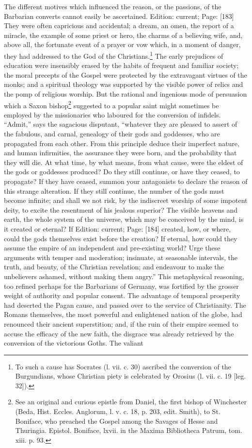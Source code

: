 The different motives which influenced the reason, or the passions, of the Barbarian converts cannot easily be ascertained. Edition: current; Page: [183] They were often capricious and accidental; a dream, an omen, the report of a miracle, the example of some priest or hero, the charms of a believing wife, and, above all, the fortunate event of a prayer or vow which, in a moment of danger, they had addressed to the God of the Christians.\footnote{To such a cause has Socrates (l. vii. c. 30) ascribed the conversion of the Burgundians, whose Christian piety is celebrated by Orosius (l. vii. c. 19 [leg. 32]).} The early prejudices of education were insensibly erased by the habits of frequent and familiar society; the moral precepts of the Gospel were protected by the extravagant virtues of the monks; and a spiritual theology was supported by the visible power of relics and the pomp of religious worship. But the rational and ingenious mode of persuasion which a Saxon bishop\footnote{See an original and curious epistle from Daniel, the first bishop of Winchester (Beda, Hist. Eccles. Anglorum, l. v. c. 18, p. 203, edit. Smith), to St. Boniface, who preached the Gospel among the Savages of Hesse and Thuringia. Epistol. Boniface, lxvii. in the Maxima Bibliotheca Patrum, tom. xiii. p. 93.} suggested to a popular saint might sometimes be employed by the missionaries who laboured for the conversion of infidels. \texthebrew{“}Admit,\texthebrew{}” says the sagacious disputant, \texthebrew{“}whatever they are pleased to assert of the fabulous, and carnal, genealogy of their gods and goddesses, who are propagated from each other. From this principle deduce their imperfect nature, and human infirmities, the assurance they were born, and the probability that they will die. At what time, by what means, from what cause, were the eldest of the gods or goddesses produced? Do they still continue, or have they ceased, to propagate? If they have ceased, summon your antagonists to declare the reason of this strange alteration. If they still continue, the number of the gods must become infinite; and shall we not risk, by the indiscreet worship of some impotent deity, to excite the resentment of his jealous superior? The visible heavens and earth, the whole system of the universe, which may be conceived by the mind, is it created or eternal? If Edition: current; Page: [184] created, how, or where, could the gods themselves exist before the creation? If eternal, how could they assume the empire of an independent and pre-existing world? Urge these arguments with temper and moderation; insinuate, at seasonable intervals, the truth, and beauty, of the Christian revelation; and endeavour to make the unbelievers ashamed, without making them angry.\texthebrew{}” This metaphysical reasoning, too refined perhaps for the Barbarians of Germany, was fortified by the grosser weight of authority and popular consent. The advantage of temporal prosperity had deserted the Pagan cause, and passed over to the service of Christianity. The Romans themselves, the most powerful and enlightened nation of the globe, had renounced their ancient superstition; and, if the ruin of their empire seemed to accuse the efficacy of the new faith, the disgrace was already retrieved by the conversion of the victorious Goths. The valiant 